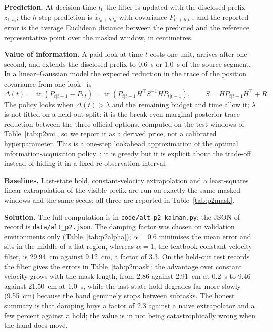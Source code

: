 \documentclass{swmcmthesis}
\begin{document}
\textbf{Prediction.} At decision time $t_0$ the filter is updated with the disclosed prefix $z_{1:t_0}$; the $h$-step prediction is $\hat x_{t_0+h|t_0}$ with covariance $P_{t_0+h|t_0}$, and the reported error is the average Euclidean distance between the predicted and the reference representative point over the masked window, in centimetres.

\textbf{Value of information.} A paid look at time $t$ costs one unit, arrives after one second, and extends the disclosed prefix to 0.6~s or 1.0~s of the source segment. In a linear--Gaussian model the expected reduction in the trace of the position covariance from one look~\cite{ref4} is
\begin{equation}
\Delta(t) = \operatorname{tr}\!\left(P_{t|t-1}-P_{t|t}\right)
        = \operatorname{tr}\!\left(P_{t|t-1}H^\top S^{-1}HP_{t|t-1}\right),
\qquad S=HP_{t|t-1}H^\top+R .
\end{equation}
The policy looks when $\Delta(t)>\lambda$ and the remaining budget and time allow it; $\lambda$ is not fitted on a held-out split: it is the break-even marginal posterior-trace reduction between the three official options, computed on the test windows of Table~\ref{tab:p2voi}, so we report it as a derived price, not a calibrated hyperparameter. This is a one-step lookahead approximation of the optimal information-acquisition policy~\cite{ref4}; it is greedy but it is explicit about the trade-off instead of hiding it in a fixed re-observation interval.

\textbf{Baselines.} Last-state hold, constant-velocity extrapolation and a least-squares linear extrapolation of the visible prefix are run on exactly the same masked windows and the same seeds; all three are reported in Table~\ref{tab:p2mask}.

\textbf{Solution.} The full computation is in \texttt{code/alt\_p2\_kalman.py}; the JSON of record is \texttt{data/alt\_p2.json}. The damping factor was chosen on validation environments only (Table~\ref{tab:p2alpha}); $\alpha=0.6$ minimises the mean error and sits in the middle of a flat region, whereas $\alpha=1$, the textbook constant-velocity filter, is 29.94~cm against 9.12~cm, a factor of 3.3. On the held-out test records the filter gives the errors in Table~\ref{tab:p2mask}: the advantage over constant velocity grows with the mask length, from 2.86 against 2.91~cm at 0.2~s to 9.46 against 21.50~cm at 1.0~s, while the last-state hold degrades far more slowly (9.55~cm) because the hand genuinely stops between subtasks. The honest summary is that damping buys a factor of 2.3 against a naive extrapolator and a few percent against a hold; the value is in not being catastrophically wrong when the hand does move.
\end{document}
